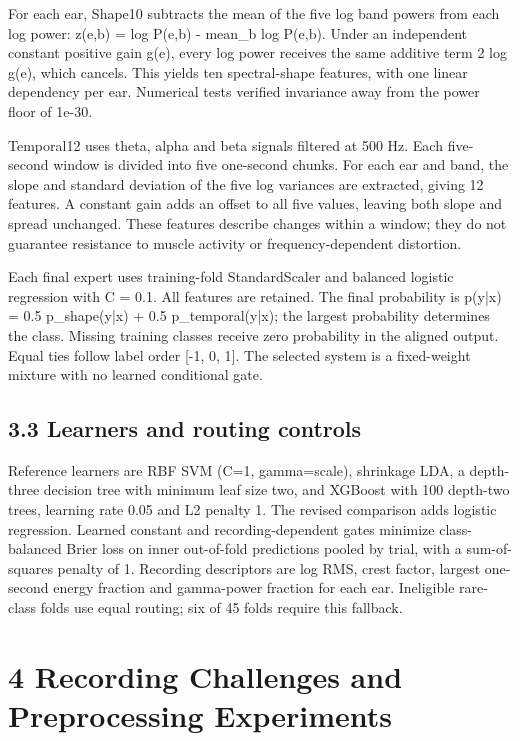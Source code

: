 \documentclass[10pt,a4paper]{article}
\begin{document}
For each ear, Shape10 subtracts the mean of the five log band powers from each log power: z(e,b) = log P(e,b) - mean\_b log P(e,b). Under an independent constant positive gain g(e), every log power receives the same additive term 2 log g(e), which cancels. This yields ten spectral-shape features, with one linear dependency per ear. Numerical tests verified invariance away from the power floor of 1e-30.


Temporal12 uses theta, alpha and beta signals filtered at 500 Hz. Each five-second window is divided into five one-second chunks. For each ear and band, the slope and standard deviation of the five log variances are extracted, giving 12 features. A constant gain adds an offset to all five values, leaving both slope and spread unchanged. These features describe changes within a window; they do not guarantee resistance to muscle activity or frequency-dependent distortion.


Each final expert uses training-fold StandardScaler and balanced logistic regression with C = 0.1. All features are retained. The final probability is p(y|x) = 0.5 p\_shape(y|x) + 0.5 p\_temporal(y|x); the largest probability determines the class. Missing training classes receive zero probability in the aligned output. Equal ties follow label order [-1, 0, 1]. The selected system is a fixed-weight mixture with no learned conditional gate.


\subsection*{3.3 Learners and routing controls}

Reference learners are RBF SVM (C=1, gamma=scale), shrinkage LDA, a depth-three decision tree with minimum leaf size two, and XGBoost with 100 depth-two trees, learning rate 0.05 and L2 penalty 1. The revised comparison adds logistic regression. Learned constant and recording-dependent gates minimize class-balanced Brier loss on inner out-of-fold predictions pooled by trial, with a sum-of-squares penalty of 1. Recording descriptors are log RMS, crest factor, largest one-second energy fraction and gamma-power fraction for each ear. Ineligible rare-class folds use equal routing; six of 45 folds require this fallback.


\section*{4 Recording Challenges and Preprocessing Experiments}
\end{document}
